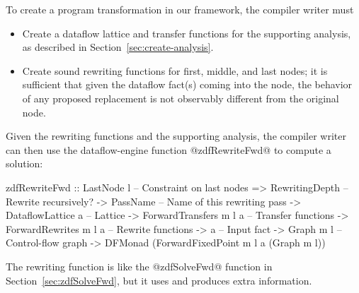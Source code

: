 \documentclass[blockstyle,preprint,nocopyrightspace]{sigplanconf}
\newcommand\secref[1]{Section~\ref{sec:#1}}
\newcommand\seclabel[1]{\label{sec:#1}}
\begin{document}
To create a program transformation in our framework,
the compiler writer must 
\begin{itemize}
\item
Create a dataflow lattice and transfer functions for the supporting
analysis, as described in \secref{create-analysis}. 
\item
Create sound rewriting functions for first, middle, and last nodes;
it is sufficient that given the dataflow fact(s) coming into the node,
the behavior of 
any proposed replacement is not observably different from the original node.
\end{itemize}
Given the rewriting functions and the supporting analysis, the
compiler writer can then use the 
dataflow-engine function @zdfRewriteFwd@ to compute a solution:
\begin{code}
  zdfRewriteFwd 
    :: LastNode l             -- Constraint on last nodes
    => RewritingDepth         -- Rewrite recursively?
    -> PassName               -- Name of this rewriting pass
    -> DataflowLattice a      -- Lattice
    -> ForwardTransfers m l a -- Transfer functions
    -> ForwardRewrites m l a  -- Rewrite functions
    -> a                      -- Input fact
    -> Graph m l              -- Control-flow graph
    -> DFMonad (ForwardFixedPoint m l a (Graph m l))
\end{code}
The rewriting function is like the @zdfSolveFwd@ function in
\secref{zdfSolveFwd}, but it uses and produces extra
information.\seclabel{engine-truth} 
\end{document}
